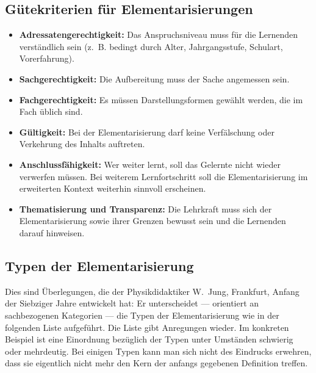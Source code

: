 \subsection{Gütekriterien für Elementarisierungen}
\begin{itemize}
	\item \textbf{Adressatengerechtigkeit:} Das Anspruchsniveau muss für die Lernenden verständlich sein (z.~B. bedingt durch Alter, Jahrgangsstufe, Schulart, Vorerfahrung).
	\item \textbf{Sachgerechtigkeit:} Die Aufbereitung muss der Sache angemessen sein.
	\item \textbf{Fachgerechtigkeit:} Es müssen Darstellungsformen gewählt werden, die im Fach üblich sind.
	\item \textbf{Gültigkeit:} Bei der Elementarisierung darf keine Verf\"{a}lschung oder Verkehrung des Inhalts auftreten.
	\item \textbf{Anschlussfähigkeit:} Wer weiter lernt, soll das Gelernte nicht wieder verwerfen müssen. Bei weiterem Lernfortschritt soll die Elementarisierung im erweiterten Kontext weiterhin sinnvoll erscheinen.
	\item \textbf{Thematisierung und Transparenz:} Die Lehrkraft muss sich der Elementarisierung sowie ihrer Grenzen bewusst sein und die Lernenden darauf hinweisen.
\end{itemize}

\subsection{Typen der Elementarisierung}
Dies sind \"{U}berlegungen, die der Physikdidaktiker W.\ Jung,
Frankfurt, Anfang der Siebziger Jahre entwickelt hat:
Er unterscheidet --- orientiert an sachbezogenen Kategorien ---
die Typen der Elementarisierung wie
in der folgenden Liste aufgef\"{u}hrt.
Die Liste gibt Anregungen wieder. Im konkreten Beispiel ist eine
Einordnung bez\"{u}glich der Typen unter Umst\"{a}nden schwierig oder
mehrdeutig.
Bei einigen Typen kann man sich nicht des Eindrucks erwehren,
dass sie eigentlich nicht mehr den Kern der anfangs
gegebenen Definition treffen.

